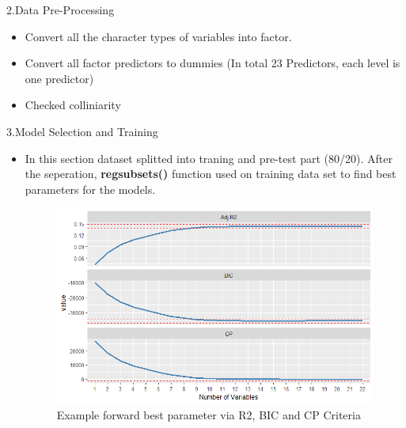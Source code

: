 \documentclass[xcolor=dvipsnames]{beamer}
\begin{document}
\begin{frame}{2.Data Pre-Processing}
\begin{itemize}
\begin{itemize}
$\Rightarrow$ \textbf{MentalHealth} converted to 3 classes which are "Bad","Fair","Good".

\newline $\Rightarrow$ \textbf{BMI} and \textbf{SleepTime} normalized.
\end{itemize}
\item Convert all the character types of variables into factor. 
\item Convert all factor predictors to dummies (In total 23 Predictors, each level is one predictor)
\item Checked colliniarity
\end{itemize}
\end{frame}

\begin{frame}{3.Model Selection and Training}
\begin{itemize}
\item In this section dataset splitted into traning and pre-test part (80/20). After the seperation, \textbf{regsubsets()} function used on training data set to find best parameters for the models.

\begin{figure}
    \centering
    \includegraphics[scale= 0.45]{regsubset.png}
    \caption{Example forward best parameter via R2, BIC and CP Criteria}
    \label{fig:my_label}
\end{figure}
\end{itemize}
\end{frame}
\end{document}
